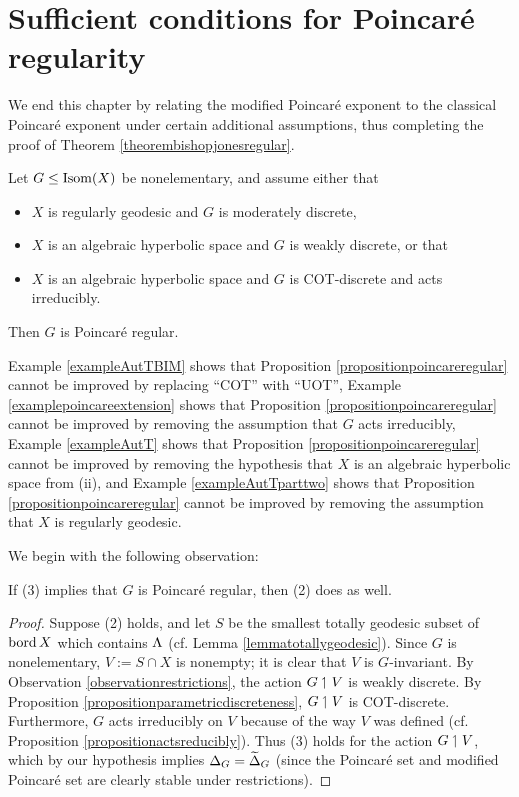 \section{Sufficient conditions for Poincar\'e regularity}
\label{subsectionpropositionpoincareregular}
We end this chapter by relating the modified Poincar\'e exponent to the classical Poincar\'e exponent under certain additional assumptions, thus completing the proof of Theorem \ref{theorembishopjonesregular}.

\begin{proposition}
\label{propositionpoincareregular}
Let $G\leq\operatorname{Isom}(X)$ be nonelementary, and assume either that
\begin{itemize}
\item[(1)] $X$ is regularly geodesic and $G$ is moderately discrete,
\item[(2)] $X$ is an algebraic hyperbolic space and $G$ is weakly discrete, or that
\item[(3)] $X$ is an algebraic hyperbolic space and $G$ is COT-discrete and acts irreducibly.
\end{itemize}
Then $G$ is Poincar\'e regular.
\end{proposition}

\begin{remark}
Example \ref{exampleAutTBIM} shows that Proposition \ref{propositionpoincareregular} cannot be improved by replacing ``COT'' with ``UOT'', Example \ref{examplepoincareextension} shows that Proposition \ref{propositionpoincareregular} cannot be improved by removing the assumption that $G$ acts irreducibly, Example \ref{exampleAutT} shows that Proposition \ref{propositionpoincareregular} cannot be improved by removing the hypothesis that $X$ is an algebraic hyperbolic space from (ii), and Example \ref{exampleAutTparttwo} shows that Proposition \ref{propositionpoincareregular} cannot be improved by removing the assumption that $X$ is regularly geodesic.
\end{remark}

We begin with the following observation:
\begin{observation}
If (3) implies that $G$ is Poincar\'e regular, then (2) does as well.
\end{observation}
\begin{proof}
Suppose (2) holds, and let $S$ be the smallest totally geodesic subset of $\operatorname{bord} X$ which contains $\Lambda$ (cf. Lemma \ref{lemmatotallygeodesic}). Since $G$ is nonelementary, $V := S\cap X$ is nonempty; it is clear that $V$ is $G$-invariant. By Observation \ref{observationrestrictions}, the action $G\upharpoonleft V$ is weakly discrete. By Proposition \ref{propositionparametricdiscreteness}, $G\upharpoonleft V$ is COT-discrete. Furthermore, $G$ acts irreducibly on $V$ because of the way $V$ was defined (cf. Proposition \ref{propositionactsreducibly}). Thus (3) holds for the action $G\upharpoonleft V$, which by our hypothesis implies $\Delta_G = \widetilde\Delta_G$ (since the Poincar\'e set and modified Poincar\'e set are clearly stable under restrictions).
\end{proof}

